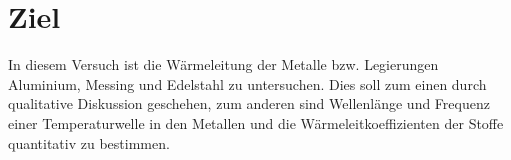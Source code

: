 \section{Ziel}
\label{sec:Ziel}
In diesem Versuch ist die Wärmeleitung der Metalle bzw. Legierungen
Aluminium, Messing und Edelstahl zu untersuchen. Dies soll zum einen durch
qualitative Diskussion geschehen, zum anderen sind Wellenlänge und Frequenz
einer Temperaturwelle in den Metallen und die Wärmeleitkoeffizienten der Stoffe
quantitativ zu bestimmen.
